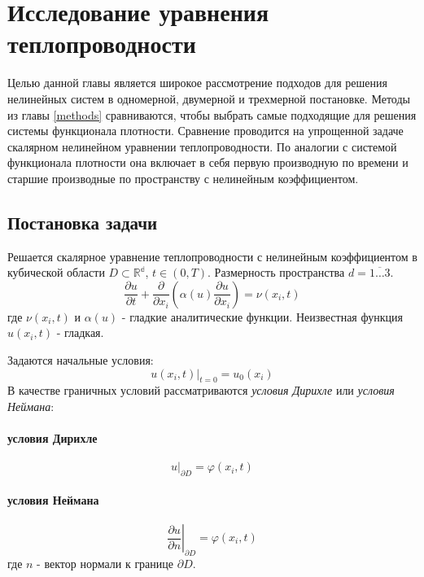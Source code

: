 \section{Исследование уравнения теплопроводности \label{heat}}
Целью данной главы является широкое рассмотрение подходов для решения нелинейных систем в одномерной, двумерной и трехмерной постановке.
Методы из главы \ref{methods} сравниваются, чтобы выбрать самые подходящие для решения системы функционала плотности. Сравнение проводится на упрощенной задаче \textemdash скалярном нелинейном уравнении теплопроводности. По аналогии с системой функционала плотности она включает в себя первую производную по времени и старшие производные по пространству с нелинейным коэффициентом.
\subsection{Постановка задачи}
Решается скалярное уравнение теплопроводности с нелинейным коэффициентом в кубической области $D \subset \mathbb{R^d}$, $t \in (0, T)$. Размерность пространства $d = \overline{1 \dots 3} $.
\begin{equation} \label{eq:heat_equation}
\frac{\partial u}{\partial t}+ \frac{\partial }{\partial x_i} \left( \alpha (u) \frac{\partial u}{\partial x_i} \right) = \nu(x_i, t)
\end{equation}
где $\nu(x_i, t)$ и $\alpha(u)$ - гладкие аналитические функции. Неизвестная функция $u(x_i, t)$ - гладкая.
\par
Задаются начальные условия:
\begin{equation} \label{eq:initial_condition_scalar}
u(x_i, t) \vert _{t = 0} = u_0(x_i)
\end{equation}
В качестве граничных условий рассматриваются \textit{условия Дирихле} или \textit{условия Неймана}:
\paragraph{условия Дирихле}
\begin{equation} \label{eq:dirichlet_heat}
u \vert_{\partial D} = \varphi(x_i, t)
\end{equation}
\paragraph{условия Неймана}
\begin{equation} \label{eq:neumann}
    \left. \frac{\partial u}{\partial n} \right \vert_{\partial D} = \varphi(x_i, t)
\end{equation}
где $n$ - вектор нормали к границе $\partial D$.
